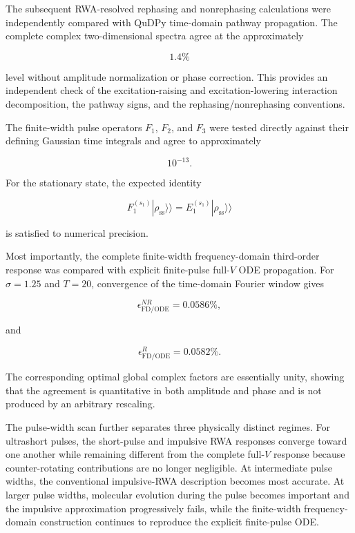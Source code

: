 \documentclass[11pt]{article}
\begin{document}
The subsequent RWA-resolved rephasing and nonrephasing calculations
were independently compared with QuDPy time-domain pathway
propagation.  The complete complex two-dimensional spectra agree at the
approximately

\begin{equation}
1.4\%
\end{equation}

level without amplitude normalization or phase correction.  This
provides an independent check of the excitation-raising and
excitation-lowering interaction decomposition, the pathway signs, and
the rephasing/nonrephasing conventions.

The finite-width pulse operators $F_1$, $F_2$, and $F_3$ were tested
directly against their defining Gaussian time integrals and agree to
approximately

\begin{equation}
10^{-13}.
\end{equation}

For the stationary state, the expected identity

\begin{equation}
F_1^{(s_1)}
|\rho_{\mathrm{ss}}\rangle\rangle
=
E_1^{(s_1)}
|\rho_{\mathrm{ss}}\rangle\rangle
\end{equation}

is satisfied to numerical precision.

Most importantly, the complete finite-width frequency-domain
third-order response was compared with explicit finite-pulse
full-$V$ ODE propagation.  For
$\sigma=1.25$ and $T=20$, convergence of the time-domain Fourier
window gives

\begin{equation}
\epsilon_{\mathrm{FD/ODE}}^{NR}
=
0.0586\%,
\end{equation}

and

\begin{equation}
\epsilon_{\mathrm{FD/ODE}}^{R}
=
0.0582\%.
\end{equation}

The corresponding optimal global complex factors are essentially
unity, showing that the agreement is quantitative in both amplitude
and phase and is not produced by an arbitrary rescaling.

The pulse-width scan further separates three physically distinct
regimes.  For ultrashort pulses, the short-pulse and impulsive RWA
responses converge toward one another while remaining different from
the complete full-$V$ response because counter-rotating contributions
are no longer negligible.  At intermediate pulse widths, the
conventional impulsive-RWA description becomes most accurate.  At
larger pulse widths, molecular evolution during the pulse becomes
important and the impulsive approximation progressively fails, while
the finite-width frequency-domain construction continues to reproduce
the explicit finite-pulse ODE.
\end{document}
